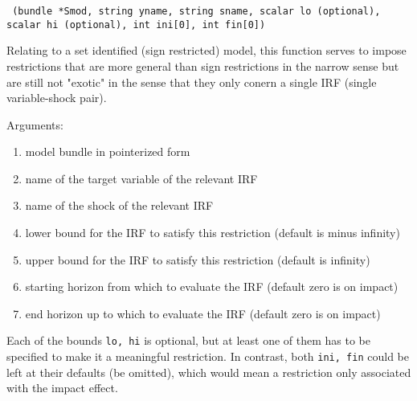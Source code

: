 \documentclass[a4paper,10pt]{article}
\newenvironment{funcdoc}[1]
{\noindent\hrulefill\newline\nopagebreak\texttt{#1}%
\nopagebreak\par\noindent\hrulefill%
\nopagebreak\par\nopagebreak\smallskip\nopagebreak\par}
{\bigskip}
\begin{document}
\begin{funcdoc}{ (bundle *Smod, string yname, string sname, scalar lo (optional),\\
  scalar hi (optional), int ini[0], int fin[0])}
  
  \noindent Relating to a set identified (sign restricted) model, this function serves to impose restrictions that
  are more general than sign restrictions in the narrow sense but are still not "exotic" in the 
  sense that they only conern a single IRF (single variable-shock pair).
  
  \noindent Arguments:
 \begin{enumerate}
 \item model bundle in pointerized form
 \item name of the target variable of the relevant IRF
 \item name of the shock of the relevant IRF
 \item lower bound for the IRF to satisfy this restriction (default is minus infinity)
 \item upper bound for the IRF to satisfy this restriction (default is infinity)
 \item starting horizon from which to evaluate the IRF (default zero is on impact)
 \item end horizon up to which to evaluate the IRF (default zero is on impact)
  \end{enumerate}
  Each of the bounds \texttt{lo, hi} is optional, but at least one of them has to be specified
  to make it a meaningful restriction. In contrast, both \texttt{ini, fin} could be left at their defaults 
  (be omitted), which would mean a restriction only associated with the impact effect.
  \end{funcdoc}
\end{document}
